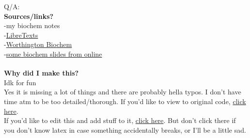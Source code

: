 \documentclass{article}
\begin{document}
\vspace{30mm}
Q/A:\\
\textbf{Sources/links?}\\
-my biochem notes\\
-\href{https://chem.libretexts.org/Textbook_Maps/Biological_Chemistry/Catalysts/Enzymatic_Kinetics/Michaelis-Menten_Kinetics}{LibreTexts}\\
-\href{http://www.worthington-biochem.com/introbiochem/enzymeconc.html}{Worthington Biochem}\\
-\href{https://pdfs.semanticscholar.org/presentation/dfae/6c13fda4a64a495943281d2e8efd8a2d366f.pdf}{some biochem slides from online}\\
\\
\textbf{Why did I make this?}\\
Idk for fun\\
Yes it is missing a lot of things and there are probably hella typos. I don't have time atm to be too detailed/thorough. If you'd like to view to original code, \href{https://www.sharelatex.com/read/cktkpzkjxjhg}{click here}.\\
If you'd like to edit this and add stuff to it, \href{https://www.sharelatex.com/4136663587tcyzzgjmrtpv}{click here}. But don't click there if you don't know latex in case something accidentally breaks, or I'll be a little sad.
\end{document}
